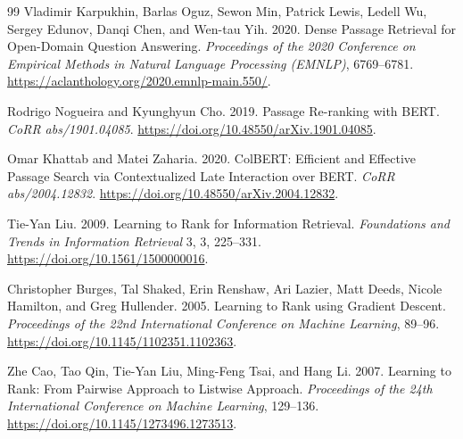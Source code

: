 \begin{thebibliography}{99}
Vladimir Karpukhin, Barlas Oguz, Sewon Min, Patrick Lewis, Ledell Wu,
Sergey Edunov, Danqi Chen, and Wen-tau Yih. 2020.
Dense Passage Retrieval for Open-Domain Question Answering.
\emph{Proceedings of the 2020 Conference on Empirical Methods in Natural
Language Processing (EMNLP)}, 6769--6781.
\url{https://aclanthology.org/2020.emnlp-main.550/}.

Rodrigo Nogueira and Kyunghyun Cho. 2019.
Passage Re-ranking with BERT.
\emph{CoRR abs/1901.04085}.
\url{https://doi.org/10.48550/arXiv.1901.04085}.

Omar Khattab and Matei Zaharia. 2020.
ColBERT: Efficient and Effective Passage Search via Contextualized Late
Interaction over BERT.
\emph{CoRR abs/2004.12832}.
\url{https://doi.org/10.48550/arXiv.2004.12832}.

Tie-Yan Liu. 2009.
Learning to Rank for Information Retrieval.
\emph{Foundations and Trends in Information Retrieval} 3, 3, 225--331.
\url{https://doi.org/10.1561/1500000016}.

Christopher Burges, Tal Shaked, Erin Renshaw, Ari Lazier, Matt Deeds,
Nicole Hamilton, and Greg Hullender. 2005.
Learning to Rank using Gradient Descent.
\emph{Proceedings of the 22nd International Conference on Machine Learning},
89--96.
\url{https://doi.org/10.1145/1102351.1102363}.

Zhe Cao, Tao Qin, Tie-Yan Liu, Ming-Feng Tsai, and Hang Li. 2007.
Learning to Rank: From Pairwise Approach to Listwise Approach.
\emph{Proceedings of the 24th International Conference on Machine Learning},
129--136.
\url{https://doi.org/10.1145/1273496.1273513}.

\end{thebibliography}

